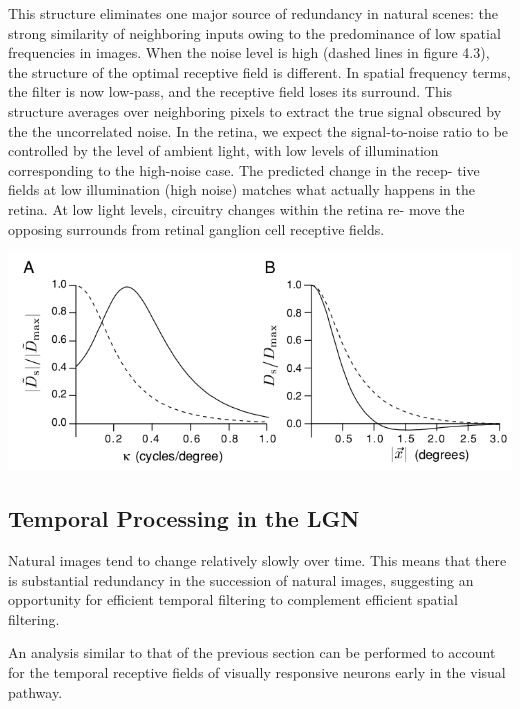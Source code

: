 \begin{exm}
This structure eliminates one major source of redundancy in natural
scenes: the strong similarity of neighboring inputs owing to the
predominance of low spatial frequencies in images. When the noise
level is high (dashed lines in figure 4.3), the structure of the
optimal receptive field is different. In spatial frequency terms, the
filter is now low-pass, and the receptive field loses its surround. This structure
averages over neighboring pixels to extract the true signal obscured
by the the uncorrelated noise. In the retina, we expect the signal-to-noise ratio to be
controlled by the level of ambient light, with low levels of illumination
corresponding to the high-noise case. The predicted change in the recep-
tive fields at low illumination (high noise) matches what actually happens
in the retina. At low light levels, circuitry changes within the retina re-
move the opposing surrounds from retinal ganglion cell receptive
fields.
\begin{center}
    \label{fig:4-3}
  \includegraphics[scale = 0.35]{./png/4-3}
\end{center}
\end{exm}


\subsection{Temporal Processing in the LGN}
\begin{rem}
  Natural images tend to change relatively slowly over time. This means
that there is substantial redundancy in the succession of natural images,
suggesting an opportunity for efficient temporal filtering to complement
efficient spatial filtering.
\end{rem}
\begin{rem}
  An analysis similar to that of the previous section
can be performed to account for the temporal receptive fields of visually
responsive neurons early in the visual pathway.
\end{rem}

